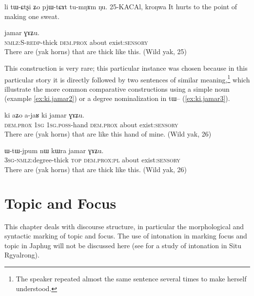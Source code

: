 \documentclass[oldfontcommands,oneside,a4paper,11pt]{memoir}
\newcommand{\ipa}[1]{{\phon #1}} %
\begin{document}
li tɯ-ɕtʂi ʑo pjɯ-tɕɤt tu-mŋɤm ŋu. 
25-KACAl, kroŋwa
It hurts to the point of making one sweat.



\begin{exe}
   \ex  \label{ex:ki.jamar1}
   \gll
[\ipa{kɯ-jpɯ-jpum}]   	\ipa{ki}   	\ipa{jamar}   	\ipa{ɣɤʑu.}   \\
   \textsc{nmlz:S-redp}-thick \textsc{dem.prox} about exist:\textsc{sensory} \\
\glt There are (yak horns) that are thick like this. (Wild yak, 25)
\end{exe}

This construction is very rare; this particular instance was chosen because in this particular story it is directly followed by two sentences of similar meaning,\footnote{The speaker repeated almost the same sentence several times to make herself understood.} which illustrate the more common comparative constructions using a simple noun (example \ref{ex:ki.jamar2}) or a degree nominalization in \ipa{tɯ}-- (\ref{ex:ki.jamar3}).

\begin{exe}
   \ex  \label{ex:ki.jamar2}
   \gll
\ipa{ki}   	\ipa{aʑo}   	\ipa{a-jaʁ}   	\ipa{ki}   	\ipa{jamar}   	\ipa{ɣɤʑu.}   \\
   \textsc{dem.prox}    \textsc{1sg} \textsc{1sg.poss}-hand   \textsc{dem.prox} about exist:\textsc{sensory} \\
\glt There are (yak horns) that are like this hand of mine. (Wild yak, 26)
\end{exe}
\begin{exe}
   \ex  \label{ex:ki.jamar3}
   \gll
\ipa{ɯ-tɯ-jpum}   	\ipa{nɯ}   	\ipa{kɯra}   	\ipa{jamar}   	\ipa{ɣɤʑu.}     \\
   \textsc{3sg-nmlz}:degree-thick \textsc{top} \textsc{dem.prox:pl} about    exist:\textsc{sensory} \\
\glt There are (yak horns) that are thick like this. (Wild yak, 26)
\end{exe}

\chapter{Topic and Focus} \label{chapt:discourse} 
This chapter deals with discourse structure, in particular the morphological and syntactic marking of topic and focus. The use of intonation in marking focus and topic in Japhug will not be discussed here (see \citet{lin09phd} for a study of intonation in Situ Rgyalrong).
\end{document}

